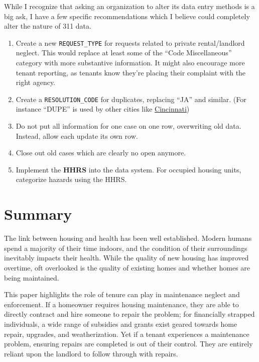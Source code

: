 \documentclass[
]{book}
\providecommand{\tightlist}{%
  \setlength{\itemsep}{0pt}\setlength{\parskip}{0pt}}
\begin{document}
While I recognize that asking an organization to alter its data entry methods is a big ask, I have a few specific recommendations which I believe could completely alter the nature of 311 data.

\begin{enumerate}
\def\labelenumi{\arabic{enumi}.}
\tightlist
\item
  Create a new \texttt{REQUEST\_TYPE} for requests related to private rental/landlord neglect. This would replace at least some of the ``Code Miscellaneous'' category with more substantive information. It might also encourage more tenant reporting, as tenants know they're placing their complaint with the right agency.
\item
  Create a \texttt{RESOLUTION\_CODE} for duplicates, replacing ``JA'' and similar. (For instance ``DUPE'' is used by other cities like \href{https://data.cincinnati-oh.gov/Thriving-Neighborhoods/Code-Enforcement/cncm-znd6}{Cincinnati})
\item
  Do not put all information for one case on one row, overwriting old data. Instead, allow each update its own row.
\item
  Close out old cases which are clearly no open anymore.
\item
  Implement the \textbf{HHRS} into the data system. For occupied housing units, categorize hazards using the HHRS.
\end{enumerate}

\hypertarget{summary}{%
\chapter{Summary}\label{summary}}

The link between housing and health has been well established. Modern humans spend a majority of their time indoors, and the condition of their surroundings inevitably impacts their health. While the quality of new housing has improved overtime, oft overlooked is the quality of existing homes and whether homes are being maintained.

This paper highlights the role of tenure can play in maintenance neglect and enforcement. If a homeowner requires housing maintenance, they are able to directly contract and hire someone to repair the problem; for financially strapped individuals, a wide range of subsidies and grants exist geared towards home repair, upgrades, and weatherization. Yet if a tenant experiences a maintenance problem, ensuring repairs are completed is out of their control. They are entirely reliant upon the landlord to follow through with repairs.
\end{document}
